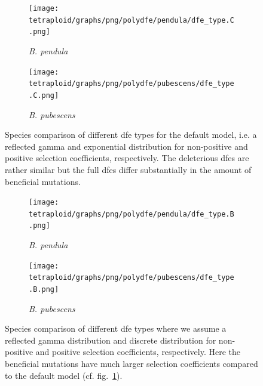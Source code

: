 \documentclass[hidelinks,11pt]{article}
\newcommand{\pendula}{\textit{B. pendula}}
\newcommand{\pubescens}{\textit{B. pubescens}}
\begin{document}
    \begin{figure}[H]
        \centering
        \begin{subfigure}[b]{0.49\textwidth}
            \centering
            \texttt{[image: tetraploid/graphs/png/polydfe/pendula/dfe\_type.C.png]}
            \caption{\pendula{}}
        \end{subfigure}
        \hfill
        \begin{subfigure}[b]{0.49\textwidth}
            \centering
            \texttt{[image: tetraploid/graphs/png/polydfe/pubescens/dfe\_type.C.png]}
            \caption{\pubescens{}}
        \end{subfigure}
        \caption{Species comparison of different \acrshort{dfe} types for the default model, i.e. a reflected gamma and exponential distribution for non-positive and positive selection coefficients, respectively. The deleterious \acrshort{dfe}s are rather similar but the full \acrshort{dfe}s differ substantially in the amount of beneficial mutations.}
        \label{fig:dfe_type_C}
    \end{figure}

    \begin{figure}[H]
        \centering
        \begin{subfigure}[b]{0.49\textwidth}
            \centering
            \texttt{[image: tetraploid/graphs/png/polydfe/pendula/dfe\_type.B.png]}
            \caption{\pendula{}}
        \end{subfigure}
        \hfill
        \begin{subfigure}[b]{0.49\textwidth}
            \centering
            \texttt{[image: tetraploid/graphs/png/polydfe/pubescens/dfe\_type.B.png]}
            \caption{\pubescens{}}
        \end{subfigure}
        \caption{Species comparison of different \acrshort{dfe} types where we assume a reflected gamma distribution and discrete distribution for non-positive and positive selection coefficients, respectively. Here the beneficial mutations have much larger selection coefficients compared to the default model (cf. fig.~\ref{fig:dfe_type_C}).}
        \label{fig:dfe_type_B}
    \end{figure}
\end{document}
